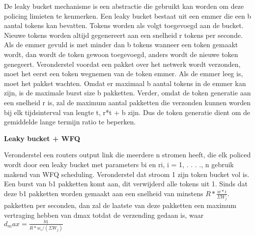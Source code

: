\noindent De leaky bucket mechanisme is een abstractie die gebruikt kan worden om deze policing limieten te kenmerken. Een leaky bucket bestaat uit een emmer die een b aantal tokens kan bevatten. Tokens worden als volgt toegevoegd aan de bucket. Nieuwe tokens worden altijd gegenereert aan een snelheid r tokens per seconde. Als de emmer gevuld is met minder dan b tokens wanneer een token gemaakt wordt, dan wordt de token gewoon toegevoegd, anders wordt de nieuwe token genegeert.
Veronderstel voordat een pakket over het netwerk wordt verzonden, moet het eerst een token wegnemen van de token emmer. Als de emmer leeg is, moet het pakket wachten.
Omdat er maximaal b aantal tokens in de emmer kan zijn, is de maximale burst size b pakketten. Verder, omdat de token generatie aan een snelheid r is, zal de maximum aantal pakketten die verzonden kunnen worden bij elk tijdsinterval van lengte t, r*t + b zijn. Dus de token generatie dient om de gemiddelde lange termijn ratio te beperken.

\textbf{Leaky bucket + WFQ}

\noindent Veronderstel een routers output link die meerdere n stromen heeft, die elk policed wordt door een leaky bucket met parameters bi en ri, i = 1, . . . ., n gebruik makend van WFQ scheduling. Veronderstel dat stroom 1 zijn token bucket vol is. Een burst van b1 pakketten komt aan, dit verwijderd alle tokens uit 1. Sinds dat deze b1 pakketten worden gemaakt aan een snelheid van minstens $R * \frac{w*i}{\Sigma W_j}$. pakketten per seconden, dan zal de laatste van deze pakketten een maximum vertraging hebben van dmax totdat de verzending gedaan is, waar $d_max = \frac{b1}{R * w_i / (\Sigma W_j)}$





